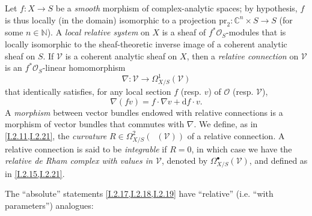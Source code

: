 \documentclass{report}
\theoremstyle{plain}
\theoremstyle{definition}
\newenvironment{env}[1]
    {\renewcommand\theinnercustomenv{#1}\innercustomenv}
    {\endinnercustomenv}
\newcommand{\sh}{\mathscr}
\newcommand{\CC}{\mathbb{C}}
\newcommand{\NN}{\mathbb{N}}
\newcommand{\dd}{\mathrm{d}}
\newcommand{\pr}{\mathrm{pr}}
\DeclareMathOperator{\shEnd}{\underline{End}}
\begin{document}
\begin{env}{2.22}
\label{I.2.22}
  Let $f\colon X\to S$ be a \emph{smooth} morphism of complex-analytic spaces;
  by hypothesis, $f$ is thus locally (in the domain) isomorphic to a projection $\pr_2\colon\CC^n\times S\to S$ (for some $n\in\NN$).
  A \emph{local relative system} on $X$ is a sheaf of $f^*\sh{O}_S$-modules that is locally isomorphic to the sheaf-theoretic inverse image of a coherent analytic sheaf on $S$.
  If $\sh{V}$ is a coherent analytic sheaf on $X$, then a \emph{relative connection} on $\sh{V}$ is an $f^*\sh{O}_S$-linear homomorphism
  \[
    \nabla\colon \sh{V} \to \Omega_{X/S}^1(\sh{V})
  \]
  that identically satisfies, for any local section $f$ (resp. $v$) of $\sh{O}$ (resp. $\sh{V}$),
  \[
    \nabla(fv) = f\cdot\nabla v + \dd f\cdot v.
  \]
  A \emph{morphism} between vector bundles endowed with relative connections is a morphism of vector bundles that commutes with $\nabla$.
  We define, as in \cref{I.2.11,I.2.21}, the \emph{curvature} $R\in\Omega_{X/S}^2(\shEnd(\sh{V}))$ of a relative connection.
  A relative connection is said to be \emph{integrable} if $R=0$, in which case we have the \emph{relative de Rham complex with values in $\sh{V}$}, denoted by $\Omega_{X/S}^\bullet(\sh{V})$, and defined as in \cref{I.2.15,I.2.21}.
\end{env}

The ``absolute'' statements \cref{I.2.17,I.2.18,I.2.19} have ``relative'' (i.e. ``with parameters'') analogues:
\end{document}
